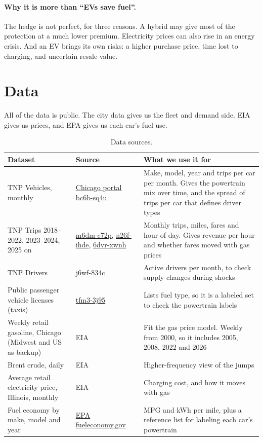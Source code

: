 \documentclass[11pt]{article}
\begin{document}
\paragraph{Why it is more than ``EVs save fuel''.} The hedge is not perfect, for three reasons. A hybrid may give most of the protection at a much lower premium. Electricity prices can also rise in an energy crisis. And an EV brings its own risks: a higher purchase price, time lost to charging, and uncertain resale value.

\section{Data}

All of the data is public. The city data gives us the fleet and demand side. EIA gives us prices, and EPA gives us each car's fuel use.

\begin{table}[ht]
\centering
\caption{Data sources.}
\small
\begin{tabularx}{\textwidth}{@{}>{\raggedright\arraybackslash}p{3.6cm} >{\raggedright\arraybackslash}p{3.4cm} Y@{}}
\toprule
Dataset & Source & What we use it for \\
\midrule
TNP Vehicles, monthly & \href{https://data.cityofchicago.org/d/bc6b-sq4u}{Chicago portal bc6b-sq4u} & Make, model, year and trips per car per month. Gives the powertrain mix over time, and the spread of trips per car that defines driver types \\
TNP Trips 2018--2022, 2023--2024, 2025 on & \href{https://data.cityofchicago.org/d/m6dm-c72p}{m6dm-c72p}, \href{https://data.cityofchicago.org/d/n26f-ihde}{n26f-ihde}, \href{https://data.cityofchicago.org/d/6dvr-xwnh}{6dvr-xwnh} & Monthly trips, miles, fares and hour of day. Gives revenue per hour and whether fares moved with gas prices \\
TNP Drivers & \href{https://data.cityofchicago.org/d/j6wf-834c}{j6wf-834c} & Active drivers per month, to check supply changes during shocks \\
Public passenger vehicle licenses (taxis) & \href{https://data.cityofchicago.org/d/tfm3-3j95}{tfm3-3j95} & Lists fuel type, so it is a labeled set to check the powertrain labels \\
Weekly retail gasoline, Chicago (Midwest and US as backup) & EIA & Fit the gas price model. Weekly from 2000, so it includes 2005, 2008, 2022 and 2026 \\
Brent crude, daily & EIA & Higher-frequency view of the jumps \\
Average retail electricity price, Illinois, monthly & EIA & Charging cost, and how it moves with gas \\
Fuel economy by make, model and year & \href{https://www.fueleconomy.gov/feg/download.shtml}{EPA fueleconomy.gov} & MPG and kWh per mile, plus a reference list for labeling each car's powertrain \\
\bottomrule
\end{tabularx}
\end{table}
\end{document}
